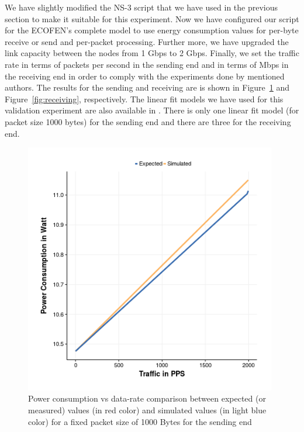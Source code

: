 We have slightly modified the NS-3 script that we have used in the previous section to make it suitable for this experiment. Now we have configured our script for the ECOFEN's complete model to use energy consumption values for per-byte receive or send and per-packet processing. Further more, we have upgraded the link capacity between the nodes from 1 Gbps to 2 Gbps. Finally, we set the traffic rate in terms of packets per second in the sending end and in terms of Mbps in the receiving end in order to comply with the experiments done by mentioned authors. The results for the sending and receiving are is shown in Figure~\ref{fig:sending} and Figure~\ref{fig:receiving}, respectively. The linear fit models we have used for this validation experiment are also available in \cite{Sivaraman}. There is only one linear fit model (for packet size 1000 bytes) for the sending end and there are three for the receiving end.   
\begin{figure}[ht]
	\begin{center}
		\includegraphics[width=11cm]{images/expectedvssimulatedsending.png}
		\caption{Power consumption vs data-rate comparison between expected (or measured) values (in red color) and simulated values (in light blue color) for a fixed packet size of 1000 Bytes for the sending end}
		\label{fig:sending}
	\end{center}
\end{figure}
